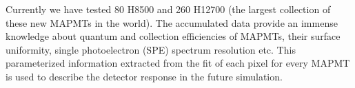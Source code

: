 Currently we have tested 80 H8500 and 260 H12700 (the largest collection of these new MAPMTs in the world).
The accumulated data provide an immense knowledge about quantum and collection efficiencies of MAPMTs, their surface uniformity, single photoelectron (SPE) spectrum resolution etc.
This parameterized information extracted from the fit of each pixel for every MAPMT is used to describe the detector response in the future simulation.


